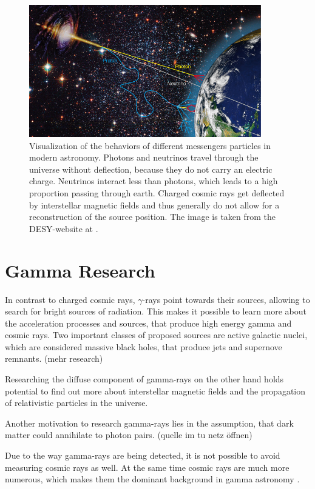 \begin{figure}
	\centering
	\captionsetup{width=0.9\linewidth}
	\includegraphics[width=0.9\textwidth]{images/astro-web-titel.jpg}
	\caption{Visualization of the behaviors of different messengers
		particles in modern astronomy.
		Photons and neutrinos travel through the universe without deflection,
		because they do not carry an electric charge.
		Neutrinos interact less than photons,
		which leads to a high proportion passing through earth.
		Charged cosmic rays get deflected by interstellar
		magnetic fields and thus generally do not allow for a reconstruction
		of the source position.
		The image is taken from the DESY-website at \cite{desy_mm_astro}.
	}
	\label{fig:multi_messenger}
\end{figure}


\section{Gamma Research}
In contrast to charged cosmic rays, $\gamma$-rays point towards
their sources, allowing to search for bright sources of radiation.
This makes it possible to learn more about the acceleration processes
and sources, that produce high energy gamma and cosmic rays.
Two important classes of proposed sources are active galactic nuclei,
which are considered massive black holes, that produce jets and 
supernove remnants. (mehr research)

Researching the diffuse component of gamma-rays on the other hand holds
potential to find out more about interstellar magnetic fields and the
propagation of relativistic particles in the universe.

Another motivation to research gamma-rays lies in the assumption, that
dark matter could annihilate to photon pairs. (quelle im tu netz öffnen)

Due to the way gamma-rays are being detected, it is not possible
to avoid measuring cosmic rays as well.
At the same time cosmic rays are much more numerous,
which makes them the dominant background in gamma astronomy \cite{funcray}.

